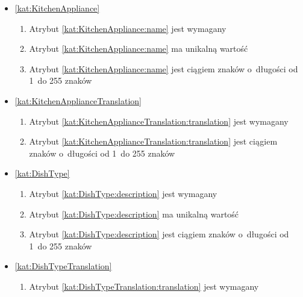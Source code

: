 \begin{itemize}[label={\textbf{Ograniczenia dla}}, wide, labelwidth=!, labelindent=0pt]
    \item\ref{kat:KitchenAppliance}\mynobreakpar
    \begin{enumerate}[label={\textbf{OGR/3/\protect\twodigits{\arabic{enumi}}}}, wide, labelwidth=!, align=left, leftmargin=3cm, resume]
        \item Atrybut \ref{kat:KitchenAppliance:name} jest wymagany

        \item Atrybut \ref{kat:KitchenAppliance:name} ma unikalną wartość

        \item Atrybut \ref{kat:KitchenAppliance:name} jest ciągiem znaków o~długości od 1~do 255 znaków
    \end{enumerate}

    \item\ref{kat:KitchenApplianceTranslation}\mynobreakpar
    \begin{enumerate}[label={\textbf{OGR/3/\protect\twodigits{\arabic{enumi}}}}, wide, labelwidth=!, align=left, leftmargin=3cm, resume]
        \item Atrybut \ref{kat:KitchenApplianceTranslation:translation} jest wymagany

        \item Atrybut \ref{kat:KitchenApplianceTranslation:translation} jest ciągiem znaków o~długości od 1~do 255 znaków
    \end{enumerate}

    \item\ref{kat:DishType}\mynobreakpar
    \begin{enumerate}[label={\textbf{OGR/3/\protect\twodigits{\arabic{enumi}}}}, wide, labelwidth=!, align=left, leftmargin=3cm, resume]
        \item Atrybut \ref{kat:DishType:description} jest wymagany

        \item Atrybut \ref{kat:DishType:description} ma unikalną wartość

        \item Atrybut \ref{kat:DishType:description} jest ciągiem znaków o~długości od 1~do 255 znaków
    \end{enumerate}

    \item\ref{kat:DishTypeTranslation}\mynobreakpar
    \begin{enumerate}[label={\textbf{OGR/3/\protect\twodigits{\arabic{enumi}}}}, wide, labelwidth=!, align=left, leftmargin=3cm, resume]
        \item Atrybut \ref{kat:DishTypeTranslation:translation} jest wymagany


\end{enumerate}
\end{itemize}
